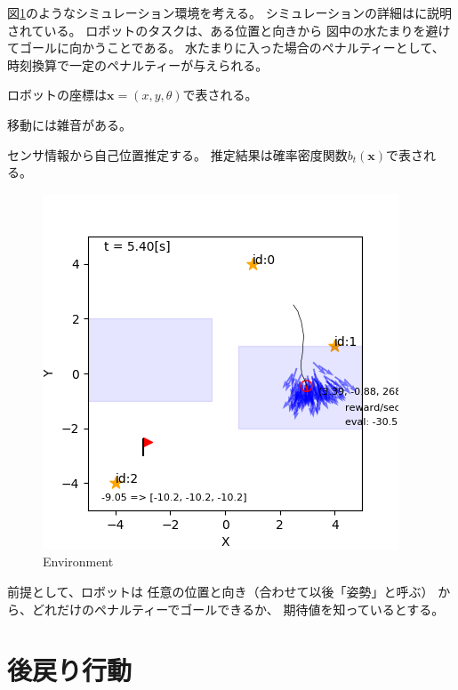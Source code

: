 \documentclass{jarticle}
\newcommand{\V}[1]{\boldsymbol{#1}}
\begin{document}
図\ref{fig:environment}のようなシミュレーション環境を考える。
シミュレーションの詳細は\cite{上田2019}に説明されている。
ロボットのタスクは、ある位置と向きから
図中の水たまりを避けてゴールに向かうことである。
水たまりに入った場合のペナルティーとして、
時刻換算で一定のペナルティーが与えられる。

ロボットの座標は$\V{x} = (x,y,\theta)$で表される。

移動には雑音がある。

センサ情報から自己位置推定する。
推定結果は確率密度関数$b_t(\V{x})$で表される。


\begin{figure}[tbh]
 \centering
  \includegraphics[width=1.0\linewidth]{figs/puddle_world.png}
  \vspace*{-4mm}
  \caption{Environment}
  \label{fig:environment}
\end{figure}

前提として、ロボットは
任意の位置と向き（合わせて以後「姿勢」と呼ぶ）
から、どれだけのペナルティーでゴールできるか、
期待値を知っているとする。

\section{後戻り行動}
\end{document}
